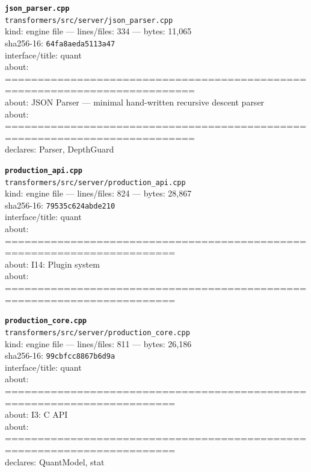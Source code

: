 \noindent\textbf{\texttt{json\_parser.cpp}}\\
\texttt{transformers/src/server/json\_parser.cpp}\\
kind: engine file --- lines/files: 334 --- bytes: 11,065\\
sha256-16: \texttt{64fa8aeda5113a47}\\
interface/title: quant\\
about: ===========================================================================\\
about: JSON Parser — minimal hand-written recursive descent parser\\
about: ===========================================================================\\
declares: Parser, DepthGuard\\
\vspace*{6.0pt}

\noindent\textbf{\texttt{production\_api.cpp}}\\
\texttt{transformers/src/server/production\_api.cpp}\\
kind: engine file --- lines/files: 824 --- bytes: 28,867\\
sha256-16: \texttt{79535c624abde210}\\
interface/title: quant\\
about: ========================================================================\\
about: I14: Plugin system\\
about: ========================================================================\\
\vspace*{6.0pt}
\newpage

\noindent\textbf{\texttt{production\_core.cpp}}\\
\texttt{transformers/src/server/production\_core.cpp}\\
kind: engine file --- lines/files: 811 --- bytes: 26,186\\
sha256-16: \texttt{99cbfcc8867b6d9a}\\
interface/title: quant\\
about: ========================================================================\\
about: I3: C API\\
about: ========================================================================\\
declares: QuantModel, stat\\
\vspace*{6.0pt}

